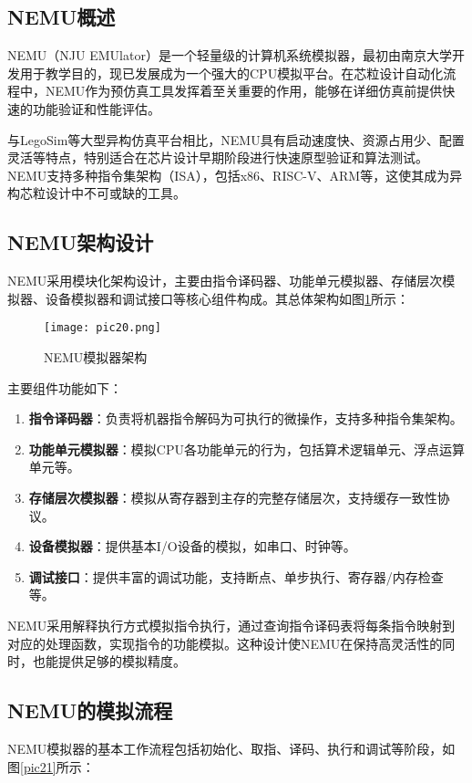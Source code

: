 \documentclass[bachelor]{thesis-uestc}
\begin{document}
\subsection{NEMU概述}
NEMU（NJU EMUlator）是一个轻量级的计算机系统模拟器，最初由南京大学开发用于教学目的，现已发展成为一个强大的CPU模拟平台。在芯粒设计自动化流程中，NEMU作为预仿真工具发挥着至关重要的作用，能够在详细仿真前提供快速的功能验证和性能评估。

与LegoSim等大型异构仿真平台相比，NEMU具有启动速度快、资源占用少、配置灵活等特点，特别适合在芯片设计早期阶段进行快速原型验证和算法测试。NEMU支持多种指令集架构（ISA），包括x86、RISC-V、ARM等，这使其成为异构芯粒设计中不可或缺的工具。

\subsection{NEMU架构设计}
NEMU采用模块化架构设计，主要由指令译码器、功能单元模拟器、存储层次模拟器、设备模拟器和调试接口等核心组件构成。其总体架构如图\ref{pic20}所示：

\begin{figure}[h]
    \texttt{[image: pic20.png]}
    \caption{NEMU模拟器架构}
    \label{pic20}
\end{figure}

主要组件功能如下：
\begin{enumerate}
    \item \textbf{指令译码器}：负责将机器指令解码为可执行的微操作，支持多种指令集架构。
    \item \textbf{功能单元模拟器}：模拟CPU各功能单元的行为，包括算术逻辑单元、浮点运算单元等。
    \item \textbf{存储层次模拟器}：模拟从寄存器到主存的完整存储层次，支持缓存一致性协议。
    \item \textbf{设备模拟器}：提供基本I/O设备的模拟，如串口、时钟等。
    \item \textbf{调试接口}：提供丰富的调试功能，支持断点、单步执行、寄存器/内存检查等。
\end{enumerate}

NEMU采用解释执行方式模拟指令执行，通过查询指令译码表将每条指令映射到对应的处理函数，实现指令的功能模拟。这种设计使NEMU在保持高灵活性的同时，也能提供足够的模拟精度。

\subsection{NEMU的模拟流程}
NEMU模拟器的基本工作流程包括初始化、取指、译码、执行和调试等阶段，如图\ref{pic21}所示：
\end{document}
